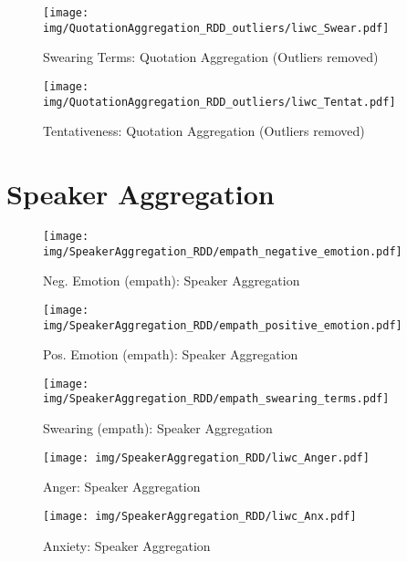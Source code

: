 \begin{figure}[h]\centering
\texttt{[image: img/QuotationAggregation\_RDD\_outliers/liwc\_Swear.pdf]}
\caption{Swearing Terms: Quotation Aggregation (Outliers removed)}
\label{fig: qa_Swearing Terms}
\end{figure}

\begin{figure}[h]\centering
\texttt{[image: img/QuotationAggregation\_RDD\_outliers/liwc\_Tentat.pdf]}
\caption{Tentativeness: Quotation Aggregation (Outliers removed)}
\label{fig: qa_Tentativeness}
\end{figure}

\clearpage
\pagebreak

\section{Speaker Aggregation}

\begin{figure}[h]\centering
\texttt{[image: img/SpeakerAggregation\_RDD/empath\_negative\_emotion.pdf]}
\caption{Neg. Emotion (empath): Speaker Aggregation}
\label{fig: sa_Neg. Emotion (empath)}
\end{figure}

\begin{figure}[h]\centering
\texttt{[image: img/SpeakerAggregation\_RDD/empath\_positive\_emotion.pdf]}
\caption{Pos. Emotion (empath): Speaker Aggregation}
\label{fig: sa_Pos. Emotion (empath)}
\end{figure}

\begin{figure}[h]\centering
\texttt{[image: img/SpeakerAggregation\_RDD/empath\_swearing\_terms.pdf]}
\caption{Swearing (empath): Speaker Aggregation}
\label{fig: sa_Swearing (empath)}
\end{figure}

\begin{figure}[h]\centering
\texttt{[image: img/SpeakerAggregation\_RDD/liwc\_Anger.pdf]}
\caption{Anger: Speaker Aggregation}
\label{fig: sa_Anger}
\end{figure}

\begin{figure}[h]\centering
\texttt{[image: img/SpeakerAggregation\_RDD/liwc\_Anx.pdf]}
\caption{Anxiety: Speaker Aggregation}
\label{fig: sa_Anxiety}
\end{figure}

